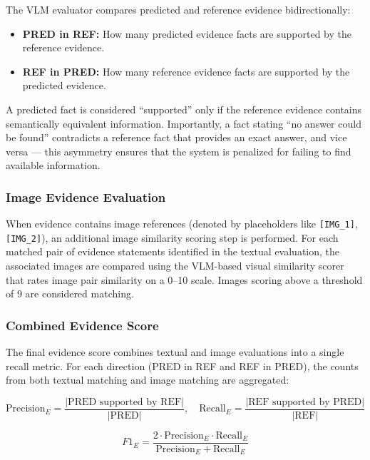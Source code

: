 The VLM evaluator compares predicted and reference evidence bidirectionally:

\begin{itemize}
    \item \textbf{PRED in REF:} How many predicted evidence facts are supported by the reference evidence.
    \item \textbf{REF in PRED:} How many reference evidence facts are supported by the predicted evidence.
\end{itemize}

A predicted fact is considered ``supported'' only if the reference evidence contains semantically equivalent information. Importantly, a fact stating ``no answer could be found'' contradicts a reference fact that provides an exact answer, and vice versa — this asymmetry ensures that the system is penalized for failing to find available information.

\subsubsection{Image Evidence Evaluation}

When evidence contains image references (denoted by placeholders like \texttt{[IMG\_1]}, \texttt{[IMG\_2]}), an additional image similarity scoring step is performed. For each matched pair of evidence statements identified in the textual evaluation, the associated images are compared using the VLM-based visual similarity scorer that rates image pair similarity on a 0--10 scale. Images scoring above a threshold of 9 are considered matching.

\subsubsection{Combined Evidence Score}

The final evidence score combines textual and image evaluations into a single recall metric. For each direction (PRED in REF and REF in PRED), the counts from both textual matching and image matching are aggregated:

\begin{equation}
    \text{Precision}_E = \frac{|\text{PRED supported by REF}|}{|\text{PRED}|}, \quad \text{Recall}_E = \frac{|\text{REF supported by PRED}|}{|\text{REF}|}
\end{equation}

\begin{equation}
    F1_E = \frac{2 \cdot \text{Precision}_E \cdot \text{Recall}_E}{\text{Precision}_E + \text{Recall}_E}
\end{equation}


